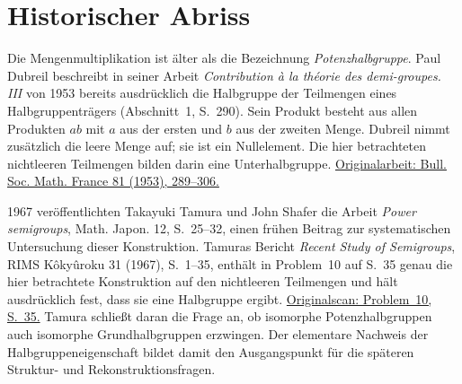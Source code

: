\clearpage
\section*{Historischer Abriss}

Die Mengenmultiplikation ist älter als die Bezeichnung
\emph{Potenzhalbgruppe}. Paul Dubreil beschreibt in seiner Arbeit
\emph{Contribution à la théorie des demi-groupes. III} von 1953
bereits ausdrücklich die Halbgruppe der Teilmengen eines Halbgruppenträgers
(Abschnitt~1, S.~290). Sein Produkt besteht aus allen Produkten
\(ab\) mit \(a\) aus der ersten und \(b\) aus der zweiten Menge.
Dubreil nimmt zusätzlich die leere Menge auf; sie ist ein Nullelement.
Die hier betrachteten nichtleeren Teilmengen bilden darin eine
Unterhalbgruppe.
\href{https://doi.org/10.24033/bsmf.1444}{Originalarbeit: Bull. Soc. Math. France 81 (1953), 289--306.}

1967 veröffentlichten Takayuki Tamura und John Shafer die Arbeit
\emph{Power semigroups}, Math. Japon. 12, S.~25--32, einen frühen
Beitrag zur systematischen Untersuchung dieser Konstruktion.
Tamuras Bericht \emph{Recent Study of Semigroups},
RIMS K\^oky\^uroku 31 (1967), S.~1--35, enthält in Problem~10
auf S.~35 genau die hier betrachtete Konstruktion auf den nichtleeren
Teilmengen und hält ausdrücklich fest, dass sie eine Halbgruppe ergibt.
\href{https://repository.kulib.kyoto-u.ac.jp/server/api/core/bitstreams/d91e4d3f-686c-448c-b6a8-318edf723d0b/content\#page=35}{Originalscan: Problem~10, S.~35.}
Tamura schließt daran die Frage an, ob isomorphe Potenzhalbgruppen
auch isomorphe Grundhalbgruppen erzwingen. Der elementare Nachweis
der Halbgruppeneigenschaft bildet damit den Ausgangspunkt für die
späteren Struktur- und Rekonstruktionsfragen.

\medskip\noindent\PowerMainLink{}\enspace\textperiodcentered\enspace\PowerProofsLink{}
